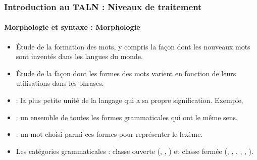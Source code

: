 \documentclass[xcolor=table]{beamer}
\begin{document}
\begin{frame}
\frametitle{Introduction au TALN : Niveaux de traitement}
\framesubtitle{Morphologie et syntaxe : Morphologie}

\begin{itemize}
	\item Étude de la formation des mots, y compris la façon dont les nouveaux mots sont inventés dans les langues du monde.
	\item Étude de la façon dont les formes des mots varient en fonction de leurs utilisations dans les phrases.
	\item {} : la plus petite unité de la langage qui a sa propre signification. Exemple, 
	\item {} : un ensemble de toutes les formes grammaticales qui ont le même sens.
	\item {} : un mot choisi parmi ces formes pour représenter le lexème.
	\item Les catégories grammaticales : classe ouverte (, , ) et classe fermée (, , , ,  , ).
\end{itemize}

\end{frame}
\end{document}
